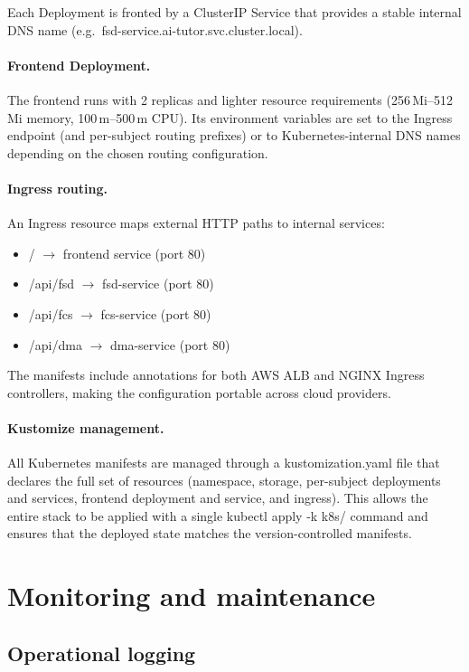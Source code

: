 Each Deployment is fronted by a ClusterIP Service that provides a stable internal DNS name (e.g.\ fsd-service.ai-tutor.svc.cluster.local).

\paragraph{Frontend Deployment.}
The frontend runs with 2 replicas and lighter resource requirements (256\,Mi--512\,Mi memory, 100\,m--500\,m CPU). Its environment variables are set to the Ingress endpoint (and per-subject routing prefixes) or to Kubernetes-internal DNS names depending on the chosen routing configuration.

\paragraph{Ingress routing.}
An Ingress resource maps external HTTP paths to internal services:

\begin{itemize}
    \item / $\rightarrow$ frontend service (port 80)
    \item /api/fsd $\rightarrow$ fsd-service (port 80)
    \item /api/fcs $\rightarrow$ fcs-service (port 80)
    \item /api/dma $\rightarrow$ dma-service (port 80)
\end{itemize}

The manifests include annotations for both AWS ALB and NGINX Ingress controllers, making the configuration portable across cloud providers.

\paragraph{Kustomize management.}
All Kubernetes manifests are managed through a kustomization.yaml file that declares the full set of resources (namespace, storage, per-subject deployments and services, frontend deployment and service, and ingress). This allows the entire stack to be applied with a single kubectl apply -k k8s/ command and ensures that the deployed state matches the version-controlled manifests.


\section{Monitoring and maintenance}
\subsection{Operational logging}

